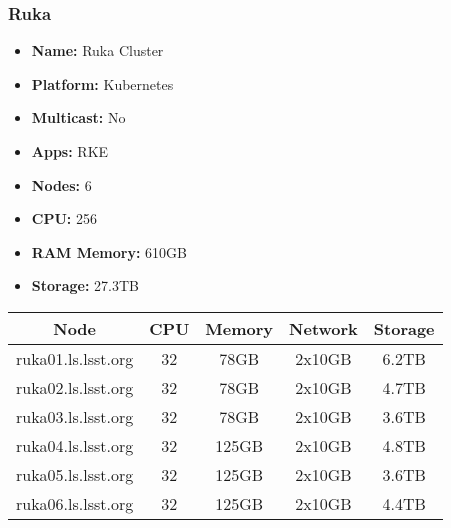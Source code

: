 \newpage
\subsubsection{Ruka}
\begin{itemize}
  \itemsep0em 
  \item \textbf{Name:}       Ruka Cluster
  \item \textbf{Platform:}   Kubernetes
  \item \textbf{Multicast:}  No
  \item \textbf{Apps:}       RKE
  \item \textbf{Nodes:}      6
  \item \textbf{CPU:}        256
  \item \textbf{RAM Memory:} 610GB
  \item \textbf{Storage:}   27.3TB
\end{itemize}
\begin{center}
  \small
  \begin{tabular}{||c c c c c||}
    \hline
    \textbf{Node} & \textbf{CPU} & \textbf{Memory} & \textbf{Network} & \textbf{Storage} \\ [0.5ex]
    \hline
    ruka01.ls.lsst.org & 32 & 78GB & 2x10GB & 6.2TB \\
    \hline
    ruka02.ls.lsst.org & 32 & 78GB & 2x10GB & 4.7TB \\
    \hline
    ruka03.ls.lsst.org & 32 & 78GB & 2x10GB & 3.6TB \\
    \hline
    ruka04.ls.lsst.org & 32 & 125GB & 2x10GB & 4.8TB \\
    \hline
    ruka05.ls.lsst.org & 32 & 125GB & 2x10GB & 3.6TB \\
    \hline
    ruka06.ls.lsst.org & 32 & 125GB & 2x10GB & 4.4TB \\
    \hline
  \end{tabular}
\end{center}

\newpage
